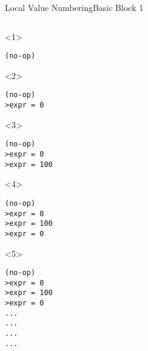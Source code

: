 \documentclass{beamer}
\begin{document}
\begin{frame}[fragile]{Local Value Numbering}{Basic Block 1}
\begin{columns}[t,onlytextwidth]
    \begin{column}[t]{.5\textwidth}
      \begin{onlyenv}<1>
        \begin{Verbatim}
(no-op)
        \end{Verbatim}
      \end{onlyenv}
      \begin{onlyenv}<2>
        \begin{Verbatim}
(no-op)
>expr = 0
        \end{Verbatim}
      \end{onlyenv}
      \begin{onlyenv}<3>
        \begin{Verbatim}
(no-op)
>expr = 0
>expr = 100
        \end{Verbatim}
      \end{onlyenv}
      \begin{onlyenv}<4>
        \begin{Verbatim}
(no-op)
>expr = 0
>expr = 100
>expr = 0
        \end{Verbatim}
      \end{onlyenv}
      \begin{onlyenv}<5>
        \begin{Verbatim}
(no-op)
>expr = 0
>expr = 100
>expr = 0
...
...
...
...
        \end{Verbatim}
      \end{onlyenv}
    \end{column}
  \end{columns}
\end{frame}
\end{document}

